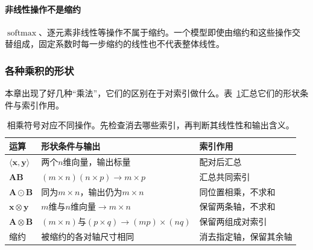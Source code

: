 \paragraph{非线性操作不是缩约}
$\operatorname{softmax}$、逐元素非线性等操作不属于缩约。一个模型即使由缩约和这些操作交替组成，固定系数时每一步缩约的线性也不代表整体线性。

\subsubsection{各种乘积的形状}

本章出现了好几种“乘法”，它们的区别在于对索引做什么。表~\ref{tab:linear-algebra-products-and-shapes}汇总它们的形状条件与索引作用。

\begin{table}[htbp]
 \centering\small
 \begin{tabularx}{\linewidth}{@{}lXX@{}}
  \toprule
  运算 & 形状条件与输出 & 索引作用\\
  \midrule
  $\langle\bm x,\bm y\rangle$ & 两个$n$维向量，输出标量 & 配对后汇总\\
  $\bm A\bm B$ & $(m\times n)(n\times p)\to m\times p$ & 汇总共同索引\\
  $\bm A\odot\bm B$ & 同为$m\times n$，输出仍为$m\times n$ & 同位置相乘，不求和\\
  $\bm x\otimes\bm y$ & $m$维与$n$维向量$\to m\times n$ & 保留两条轴，不求和\\
  $\bm A\otimes\bm B$ & $(m\times n)$与$(p\times q)\to(mp)\times(nq)$ & 保留两组成对索引\\
  缩约 & 被缩约的各对轴尺寸相同 & 消去指定轴，保留其余轴\\
  \bottomrule
 \end{tabularx}
 \caption{相乘符号对应不同操作。先检查消去哪些索引，再判断其线性性和输出含义。}
 \label{tab:linear-algebra-products-and-shapes}
\end{table}
